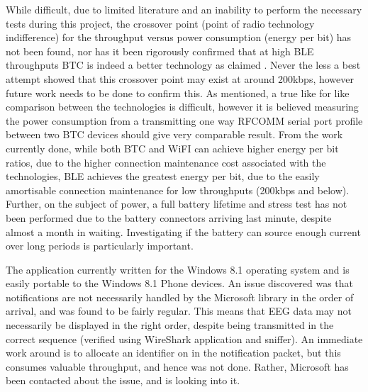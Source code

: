 \documentclass[]{article}
\begin{document}
While difficult, due to limited literature and an inability to perform the necessary tests during this project, the crossover point (point of radio technology indifference) for the throughput versus power consumption (energy per bit) has not been found, nor has it been rigorously confirmed that at high \ac{BLE} throughputs \ac{BTC} is indeed a better technology as claimed \cite{sig}. Never the less a best attempt showed that this crossover point may exist at around 200kbps, however future work needs to be done to confirm this. As mentioned, a true like for like comparison between the technologies is difficult, however it is believed measuring the power consumption from a transmitting one way RFCOMM serial port profile between two \ac{BTC} devices should give very comparable result. From the work currently done, while both \ac{BTC} and \ac{WiFI} can achieve higher energy per bit ratios, due to the higher connection maintenance cost associated with the technologies, \ac{BLE} achieves the greatest energy per bit, due to the easily amortisable connection maintenance for low throughputs (200kbps and below). Further, on the subject of power, a full battery lifetime and stress test has not been performed due to the battery connectors arriving last minute, despite almost a month in waiting. Investigating if the battery can source enough current over long periods is particularly important. 

The application currently written for the Windows 8.1 operating system and is easily portable to the Windows 8.1 Phone devices. An issue discovered was that notifications are not necessarily handled by the Microsoft library in the order of arrival, and was found to be fairly regular. This means that \ac{EEG} data may not necessarily be displayed in the right order, despite being transmitted in the correct sequence (verified using WireShark application and sniffer). An immediate work around is to allocate an identifier on in the notification packet, but this consumes valuable throughput, and hence was not done. Rather, Microsoft has been contacted about the issue, and is looking into it. 
\end{document}
